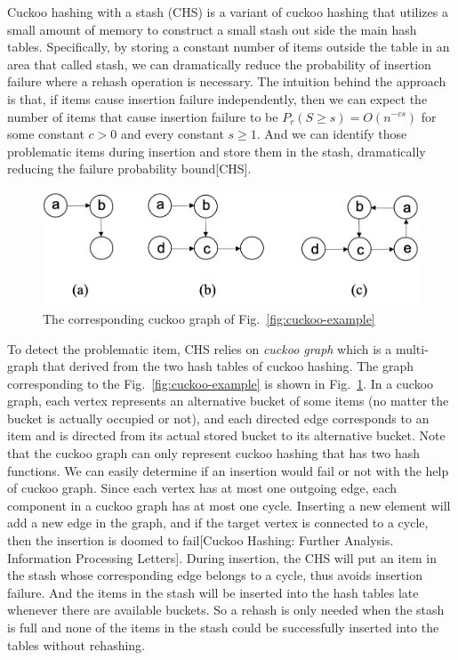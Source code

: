 \documentclass[12pt,conference,compsoc]{IEEEtran}
\begin{document}
Cuckoo hashing with a stash (CHS) is a variant of cuckoo hashing that utilizes a small amount of memory to construct a small stash out side the main hash tables. Specifically, by storing a constant number of items outside the table in an area that called stash, we can dramatically reduce the probability of insertion failure where a rehash operation is necessary. The intuition behind the approach is that, if items cause insertion failure independently, then we can expect the number of items that cause insertion failure to be \textbf{$P_r$}$(S\geq s)=O(n^{-cs})$ for some constant $c>0$ and every constant $s\geq 1$. And we can identify those problematic items during insertion and store them in the stash, dramatically reducing the failure probability bound[CHS].

\begin{figure}
    \centering
    \includegraphics[width=\linewidth]{cuckoo-graph.png}
    \caption{The corresponding cuckoo graph of Fig.~\ref{fig:cuckoo-example}
    } \label{fig:cuckoo-graph}
\end{figure}

To detect the problematic item, CHS relies on \textit{cuckoo graph} which is a multi-graph that derived from the two hash tables of cuckoo hashing. The graph corresponding to the Fig.~\ref{fig:cuckoo-example} is shown in Fig.~\ref{fig:cuckoo-graph}. In a cuckoo graph, each vertex represents an alternative bucket of some items (no matter the bucket is actually occupied or not), and each directed edge corresponds to an item and is directed from its actual stored bucket to its alternative bucket. Note that the cuckoo graph can only represent cuckoo hashing that has two hash functions. We can easily determine if an insertion would fail or not with the help of cuckoo graph. Since each vertex has at most one outgoing edge, each component in a cuckoo graph has at most one cycle. Inserting a new element will add a new edge in the graph, and if the target vertex is connected to a cycle, then the insertion is doomed to fail[Cuckoo Hashing: Further Analysis. Information Processing Letters]. During insertion, the CHS will put an item in the stash whose corresponding edge belongs to a cycle, thus avoids insertion failure. And the items in the stash will be inserted into the hash tables late whenever there are available buckets. So a rehash is only needed when the stash is full and none of the items in the stash could be successfully inserted into the tables without rehashing.
\end{document}

